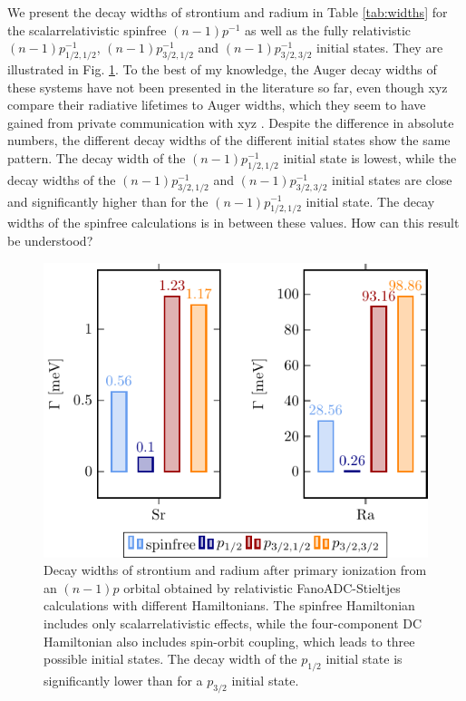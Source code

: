 We present the decay widths of strontium and radium in Table \ref{tab:widths}
for the scalarrelativistic spinfree $(n-1)p^{-1}$ as well as the
fully relativistic $(n-1)p_{1/2,1/2}^{-1}$, $(n-1)p_{3/2,1/2}^{-1}$ and
$(n-1)p_{3/2,3/2}^{-1}$ initial states. They are illustrated in Fig. \ref{fig:gamma}.
To the best of my knowledge, the Auger decay widths of these systems have
not been presented in the literature so far, even though xyz compare their
radiative lifetimes to Auger widths, which they seem to have gained
from private communication with xyz \cite{}.
Despite the difference in absolute numbers, the different decay widths
of the different initial states show the same pattern. The decay width of
the $(n-1)p_{1/2,1/2}^{-1}$ initial state is lowest, while the decay widths
of the $(n-1)p_{3/2,1/2}^{-1}$ and
$(n-1)p_{3/2,3/2}^{-1}$ initial states are close and significantly higher than
for the $(n-1)p_{1/2,1/2}^{-1}$ initial state. The decay widths of the
spinfree calculations is in between these values.
How can this result be understood?

\begin{figure}[h]
 \centering
 \includegraphics[width=0.95\columnwidth]{pics/gamma_group.pdf}
 \caption{Decay widths of strontium and radium after primary ionization from
          an $(n-1)p$ orbital obtained by relativistic FanoADC-Stieltjes
          calculations with different Hamiltonians. The spinfree Hamiltonian
          includes only scalarrelativistic effects, while the four-component
          DC Hamiltonian also includes spin-orbit coupling, which leads to
          three possible initial states. The decay width of the $p_{1/2}$
          initial state is significantly lower than for a $p_{3/2}$ initial
          state.}
 \label{fig:gamma}
\end{figure}

